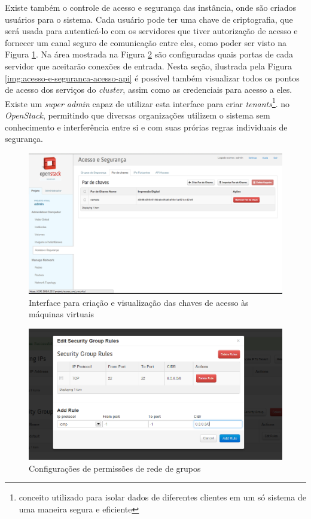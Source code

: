 Existe também o controle de acesso e segurança das instância, onde são criados
usuários para o sistema. Cada usuário pode ter uma chave de criptografia, que será
usada para autenticá-lo com os servidores que tiver autorização de acesso e
fornecer um canal seguro de comunicação entre eles, como poder ser visto na
Figura \ref{img:acesso-e-seguranca-chaves}. Na área mostrada na Figura
\ref{img:acesso-e-seguranca-grupos-site} são
configuradas quais portas de cada servidor que aceitarão conexões de entrada.
Nesta seção, ilustrada pela Figura \ref{img:acesso-e-seguranca-acesso-api} é
possível também visualizar todos os pontos de acesso dos serviços
do \emph{cluster}, assim como as credenciais para acesso a eles.
Existe um \emph{super admin} capaz de utilizar esta interface para criar
\emph{tenants}\footnote{conceito utilizado para isolar dados de diferentes clientes
em um só sistema de uma maneira segura e eficiente}.
no \emph{OpenStack}, permitindo que diversas organizações utilizem o sistema sem
conhecimento e interferência entre si e com suas prórias regras individuais de
segurança.

\begin{figure}[h]
  \center
  \includegraphics[scale=0.3]{imagem/acesso-e-seguranca-chaves.png}
  \caption{Interface para criação e visualização das chaves de acesso às máquinas
 virtuais}
  \label{img:acesso-e-seguranca-chaves}
\end{figure}

\begin{figure}[h]
  \center
  \includegraphics[scale=0.6]{imagem/acesso-e-seguranca-grupos-site.png}
  \caption{Configurações de permissões de rede de grupos}
  \label{img:acesso-e-seguranca-grupos-site}
\end{figure}

